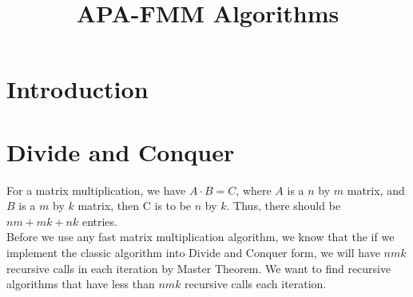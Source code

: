 \documentclass{article}
\title{APA-FMM Algorithms}
\author{}
\date{}
\begin{document}
\maketitle

\section{Introduction}

\section{Divide and Conquer}
For a matrix multiplication, we have $A\cdot B = C$, where $A$ is a $n$ by $m$ matrix, and $B$ is a $m$ by $k$ matrix, then C is to be $n$ by $k$. Thus, there should be $nm + mk + nk$ entries.\\
Before we use any fast matrix multiplication algorithm, we know that the if we implement the classic algorithm into Divide and Conquer form, we will have $nmk$ recursive calls in each iteration by Master Theorem. We want to find recursive algorithms that have less than $nmk$ recursive calls each iteration.\\
\end{document}
